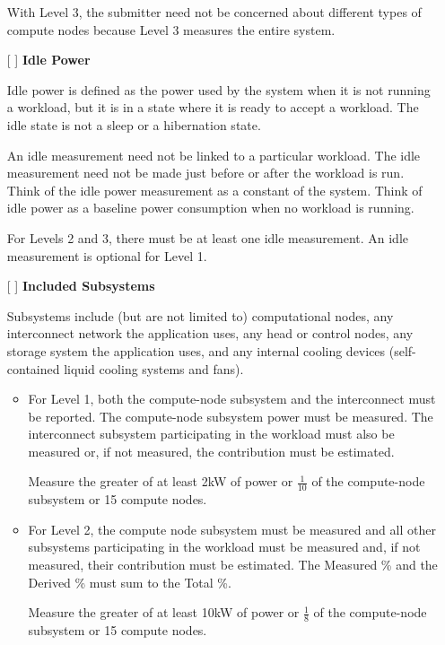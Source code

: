 \begin{itemize}
With Level 3, the submitter need not be concerned about different types of compute nodes because Level 3 measures the entire system.


\item[{[ ]}]
\textbf{Idle Power}

Idle power is defined as the power used by the system when it is not running a workload, but it is in a state where it is ready to accept a workload. The idle state is not a sleep or a hibernation state.

An idle measurement need not be linked to a particular workload. The idle measurement need not be made just before or after the workload is run. Think of the idle power measurement as a constant of the system. Think of idle power as a baseline power consumption when no workload is running. 

For Levels 2 and 3, there must be at least one idle measurement. An idle measurement is optional for Level 1. 

\newpage
\item[{[ ]}]
\textbf{Included Subsystems}

Subsystems include (but are not limited to) computational nodes, any interconnect network the application uses, any head or control nodes, any storage system the application uses, and any internal cooling devices (self-contained liquid cooling systems and fans).  

\begin{itemize}
\item
For Level 1, both the compute-node subsystem and the interconnect must be reported.  
The compute-node subsystem power must be measured. 
The interconnect subsystem participating in the workload must also be measured or, if not measured, the contribution must be estimated.

Measure the greater of at least 2kW of power or $ \frac{1}{10} $ of the compute-node subsystem or 15 compute nodes.

\item
For Level 2, the compute node subsystem must be measured and all other subsystems participating in the workload must be measured and, if not measured, their contribution must be estimated.
The Measured \% and the Derived \% must sum to the Total \%.

Measure the greater of at least 10kW of power or $ \frac{1}{8} $ of the compute-node subsystem or 15 compute nodes.


\end{itemize}
\end{itemize}
